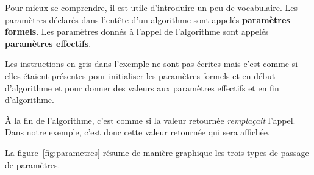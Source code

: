 	Pour mieux se comprendre,
	il est utile d’introduire un peu de vocabulaire.
	Les paramètres déclarés dans l’entête d’un algorithme
	sont appelés \textbf{paramètres formels}.
	Les paramètres donnés à l’appel de l’algorithme
	sont appelés \textbf{paramètres effectifs}. 
	
	Les instructions en gris dans l’exemple ne sont pas écrites
	mais c’est comme si elles étaient présentes
	pour initialiser les paramètres formels \In{} et \InOut{}
	en début d’algorithme
	et pour donner des valeurs 
	aux paramètres effectifs \Out{} et \InOut{}
	en fin d’algorithme.
	
	À la fin de l’algorithme, 
	c’est comme si la valeur retournée \emph{remplaçait} l’appel.
	Dans notre exemple, c’est donc cette valeur retournée
	qui sera affichée.
	
La figure~\ref{fig:parametres} résume de manière graphique les trois types de passage de paramètres.


